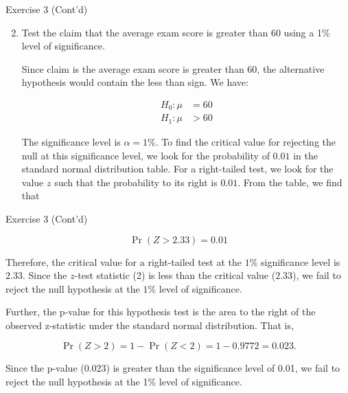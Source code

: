 \documentclass[
  ignorenonframetext,
  aspectratio=43,
]{beamer}
\let\olditem\item
\renewcommand\item{\olditem\justifying}
\begin{document}
\begin{frame}{Exercise 3 (Cont'd)}
\protect\hypertarget{exercise-3-contd-3}{}
\begin{enumerate}
\setcounter{enumi}{1}
\item
  Test the claim that the average exam score is greater than 60 using a
  1\% level of significance.

  \pause

  Since claim is the average exam score is greater than 60, the
  alternative hypothesis would contain the less than sign. We have:
  \vspace{-17pt}

  \pause

  \[
   \begin{aligned}
   H_0:\mu &= 60 \\ 
   H_1:\mu &> 60
   \end{aligned}
   \]

  \pause

  The significance level is \(\alpha=1\%\). To find the critical value
  for rejecting the null at this significance level, we look for the
  probability of \(0.01\) in the standard normal distribution table. For
  a right-tailed test, we look for the value \(z\) such that the
  probability to its right is \(0.01\). From the table, we find that
\end{enumerate}
\end{frame}

\begin{frame}{Exercise 3 (Cont'd)}
\protect\hypertarget{exercise-3-contd-4}{}
\pause

\[
\Pr(Z>2.33)=0.01
\]

\pause

Therefore, the critical value for a right-tailed test at the \(1\%\)
significance level is \(2.33\). Since the \(z\)-test statistic (2) is
less than the critical value (\(2.33\)), we fail to reject the null
hypothesis at the \(1\%\) level of significance.

\pause

Further, the p-value for this hypothesis test is the area to the right
of the observed z-statistic under the standard normal distribution. That
is, \vspace{-10pt}

\pause

\[
\Pr(Z>2)=1-\Pr(Z<2)=1-0.9772=0.023.
\]

\pause

Since the p-value (0.023) is greater than the significance level of
0.01, we fail to reject the null hypothesis at the 1\% level of
significance.
\end{frame}
\end{document}
